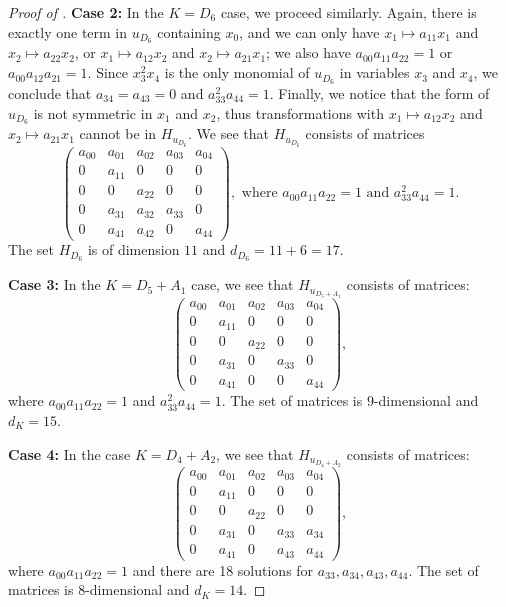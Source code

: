 \documentclass[12pt]{amsart}
\numberwithin{equation}{section}
\theoremstyle{plain}
\theoremstyle{remark}
\theoremstyle{definition}
\begin{document}
\begin{proof}[Proof of ]
    \noindent \textbf{Case 2:} In the $K=D_6$ case, we proceed similarly. Again, there is exactly one term in $u_{D_6}$ containing $x_0$, and we can only have $x_1\mapsto a_{11}x_1$ and $x_2\mapsto a_{22}x_2$, or $x_1\mapsto a_{12}x_2$ and $x_2\mapsto a_{21}x_1$; we also have $a_{00}a_{11}a_{22}=1$ or $a_{00}a_{12}a_{21}=1$. Since $x_3^2x_4$ is the only monomial of $u_{D_6}$ in variables $x_3$ and $x_4$, we conclude that $a_{34}=a_{43}=0$ and $a_{33}^2a_{44}=1$. Finally, we notice that the form of $u_{D_6}$ is not symmetric in $x_1$ and $x_2$, thus transformations with $x_1\mapsto a_{12}x_2$ and $x_2\mapsto a_{21}x_1$ cannot be in $H_{u_{D_6}}$. We see that $H_{u_{D_6}}$ consists of matrices
    $$
    \begin{pmatrix}
        a_{00} & a_{01} & a_{02} & a_{03} & a_{04}\\
             0 & a_{11} &      0 &      0 &      0\\
             0 &      0 & a_{22} &      0 &      0\\
             0 & a_{31} & a_{32} & a_{33} &      0\\
             0 & a_{41} & a_{42} &      0 & a_{44}
    \end{pmatrix}, \text{ where } a_{00}a_{11}a_{22}=1 \text{ and } a_{33}^2a_{44}=1.
    $$
    The set $H_{D_6}$ is of dimension $11$ and $d_{D_6}=11+6=17$.

    \medskip

    \noindent\textbf{Case 3:} In the $K=D_5+A_1$ case, we see that $H_{u_{D_5+A_1}}$ consists of matrices:
$$
\begin{pmatrix}
        a_{00} & a_{01} & a_{02} & a_{03} & a_{04}\\
        0 & a_{11} &      0 &      0 &      0\\
        0 &      0 & a_{22} &      0 &      0\\
        0 & a_{31} &      0 & a_{33} &      0\\
        0 & a_{41} &      0 &      0 & a_{44}
\end{pmatrix}, 
$$
where $a_{00}a_{11}a_{22}=1$ and $a_{33}^2a_{44}=1.$
The set of matrices is $9$-dimensional and $d_K=15$. 

\medskip

\noindent\textbf{Case 4:} In the case $K=D_4+A_2$, we see that $H_{u_{D_4+A_2}}$ consists of matrices:
$$
\begin{pmatrix}
        a_{00} & a_{01} & a_{02} & a_{03} & a_{04}\\
        0 & a_{11} &      0 &      0 &      0\\
        0 &      0 & a_{22} &      0 &      0\\
        0 & a_{31} &      0 & a_{33} & a_{34}\\
        0 & a_{41} &      0 & a_{43} & a_{44}
\end{pmatrix},$$
where $a_{00}a_{11}a_{22}=1$ and there are 18 solutions for $a_{33},a_{34},a_{43},a_{44}$. The set of matrices is $8$-dimensional and $d_K=14$. 


\end{proof}
\end{document}
